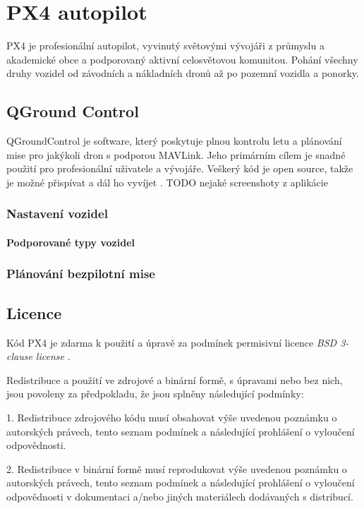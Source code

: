 \chapter{PX4 autopilot}

PX4 je profesionální autopilot, vyvinutý světovými vývojáři z průmyslu a akademické obce a podporovaný aktivní celosvětovou komunitou. Pohání všechny druhy vozidel od závodních a nákladních dronů až po pozemní vozidla a ponorky. 

\section{QGround Control}

QGroundControl je software, který poskytuje plnou kontrolu letu a plánování mise pro jakýkoli dron s podporou MAVLink. Jeho primárním cílem je snadné použití pro profesionální uživatele a vývojáře. Veškerý kód je open source, takže je možné přispívat a dál ho vyvíjet \cite{QGround}.
TODO nejaké screenshoty z aplikácie

\subsection{Nastavení vozidel}

\subsubsection{Podporované typy vozidel}

\subsection{Plánování bezpilotní mise}


\section{Licence}

Kód PX4 je zdarma k použití a úpravě za podmínek permisivní licence \textit{BSD 3-clause license} \cite{BSDlicense}.

Redistribuce a použití ve zdrojové a binární formě, s úpravami nebo bez nich, jsou povoleny za předpokladu, že jsou splněny následující podmínky:

1. Redistribuce zdrojového kódu musí obsahovat výše uvedenou poznámku o autorských právech, tento seznam podmínek a následující prohlášení o vyloučení odpovědnosti.

2. Redistribuce v binární formě musí reprodukovat výše uvedenou poznámku o autorských právech, tento seznam podmínek a následující prohlášení o vyloučení odpovědnosti v dokumentaci a/nebo jiných materiálech dodávaných s distribucí.

